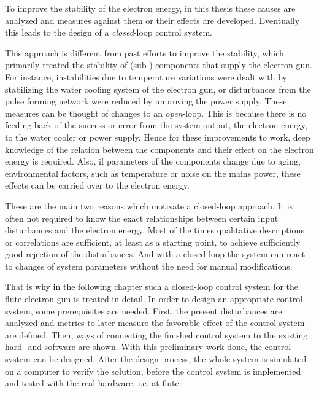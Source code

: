 To improve the stability of the electron energy, in this thesis these causes are analyzed and measures against them or their effects are developed. Eventually this leads to the design of a \textit{closed}-loop control system. 

This approach is different from past efforts to improve the stability, which primarily treated the stability of (sub-) components that supply the electron gun. For instance, instabilities due to temperature variations were dealt with by stabilizing the water cooling system of the electron gun, or disturbances from the pulse forming network were reduced by improving the power supply. These measures can be thought of changes to an \textit{open}-loop. This is because there is no feeding back of the success or error from the system output, the electron energy, to the water cooler or power supply. Hence for these improvements to work, deep knowledge of the relation between the components and their effect on the electron energy is required. Also, if parameters of the components change due to aging, environmental factors, such as temperature or noise on the mains power, these effects can be carried over to the electron energy.

These are the main two reasons which motivate a closed-loop approach. It is often not required to know the exact relationships between certain input disturbances and the electron energy. Most of the times qualitative descriptions or correlations are sufficient, at least as a starting point, to achieve sufficiently good rejection of the disturbances. And with a closed-loop the system can react to changes of system parameters without the need for manual modifications.

That is why in the following chapter such a closed-loop control system for the \gls{flute} electron gun is treated in detail. In order to design an appropriate control system, some prerequisites are needed. First, the present disturbances are analyzed and metrics to later measure the favorable effect of the control system are defined. Then, ways of connecting the finished control system to the existing hard- and software are shown. With this preliminary work done, the control system can be designed. After the design process, the whole system is simulated on a computer to verify the solution, before the control system is implemented and tested with the real hardware, i.e. at \gls{flute}.

